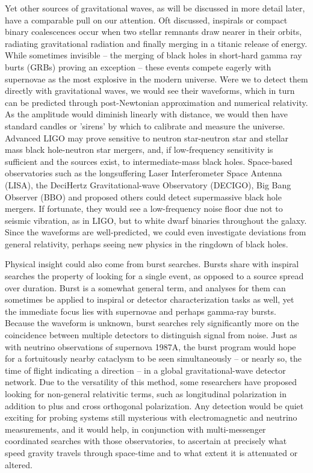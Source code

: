 		Yet other sources of gravitational waves, as will be discussed in more detail later, have a comparable pull on our attention. Oft discussed, inspirals or compact binary coalescences occur when two stellar remnants draw nearer in their orbits, radiating gravitational radiation and finally merging in a titanic release of energy. While sometimes invisible -- the merging of black holes in short-hard gamma ray burts (GRBs) proving an exception -- these events compete eagerly with supernovae as the most explosive in the modern universe. Were we to detect them directly with gravitational waves, we would see their waveforms, which in turn can be predicted through post-Newtonian approximation and numerical relativity. As the amplitude would diminish linearly with distance, we would then have standard candles or 'sirens' by which to calibrate and measure the universe. Advanced LIGO may prove sensitive to neutron star-neutron star and stellar mass black hole-neutron star mergers, and, if low-frequency sensitivity is sufficient and the sources exist, to intermediate-mass black holes. Space-based observatories such as the longsuffering Laser Interferometer Space Antenna (LISA), the DeciHertz Gravitational-wave Observatory (DECIGO), Big Bang Observer (BBO) and proposed others could detect supermassive black hole mergers. If fortunate, they would see a low-frequency noise floor due not to seismic vibration, as in LIGO, but to white dwarf binaries throughout the galaxy. Since the waveforms are well-predicted, we could even investigate deviations from general relativity, perhaps seeing new physics in the ringdown of black holes.

		Physical insight could also come from burst searches. Bursts share with inspiral searches the property of looking for a single event, as opposed to a source spread over duration. Burst is a somewhat general term, and analyses for them can sometimes be applied to inspiral or detector characterization tasks as well, yet the immediate focus lies with supernovae and perhaps gamma-ray bursts. Because the waveform is unknown, burst searches rely significantly more on the coincidence between multiple detectors to distinguish signal from noise. Just as with neutrino observations of supernova 1987A, the burst program would hope for a fortuitously nearby cataclysm to be seen simultaneously -- or nearly so, the time of flight indicating a direction -- in a global gravitational-wave detector network. Due to the versatility of this method, some researchers have proposed looking for non-general relativitic terms, such as longitudinal polarization in addition to plus and cross orthogonal polarization. Any detection would be quiet exciting for probing systems still mysterious with electromagnetic and neutrino measurements, and it would help, in conjunction with multi-messenger coordinated searches with those observatories, to ascertain at precisely what speed gravity travels through space-time and to what extent it is attenuated or altered.

